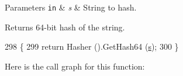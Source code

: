 \begin{DoxyParams}[1]{Parameters}
\mbox{\tt in}  & {\em s} & String to hash. \\
\hline
\end{DoxyParams}
\begin{DoxyReturn}{Returns}
64-\/bit hash of the string. 
\end{DoxyReturn}

\begin{DoxyCode}
298 \{
299   \textcolor{keywordflow}{return} Hasher ().GetHash64 (\hyperlink{generate__test__data__lte__sinr_8m_ad83eeb3a142285d1243a08c6b7026df8}{s});
300 \}
\end{DoxyCode}


Here is the call graph for this function\+:


